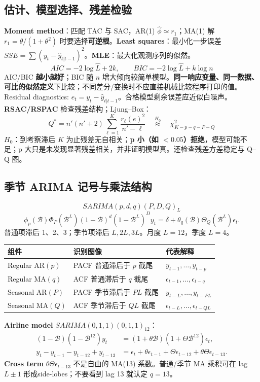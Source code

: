 \documentclass[UTF8,fontset=fandol,10.5pt,a4paper]{ctexart}
\newcommand{\eng}[1]{{\sffamily\color{navy}#1}}
\newcommand{\formula}[1]{\[\boxed{#1}\]}
\newcommand{\thick}{\renewcommand{\arraystretch}{1.18}}
\begin{document}
\subsection{估计、模型选择、残差检验}
\textbf{Moment method}：匹配 TAC 与 SAC，AR(1) $\hat\phi\simeq r_1$；MA(1) 解 $r_1=\theta/(1+\theta^2)$ 时要选择\textbf{可逆根}。\textbf{Least squares}：最小化一步误差 $SSE=\sum(y_t-\hat y_{t|t-1})^2$。\textbf{MLE}：最大化观测序列的似然。
\formula{AIC=-2\log\hat L+2k,\qquad BIC=-2\log\hat L+k\log n}
AIC/BIC \textbf{越小越好}；BIC 随 $n$ 增大倾向较简单模型。\textbf{同一响应变量、同一数据、可比的似然定义}下比较；不同差分/变换时不应直接机械比较程序打印的值。
\eng{Residual diagnostics}: $e_t=y_t-\hat y_{t|t-1}$。合格模型剩余误差应近似白噪声。\textbf{RSAC/RSPAC} 检查残差结构；\eng{Ljung--Box}：
\formula{Q^*=n'(n'+2)\sum_{\ell=1}^{K}\frac{r_\ell(e)^2}{n'-\ell}\quad\overset{H_0}{\approx}\quad\chi^2_{K-p-q-P-Q}}
$H_0$：到考察滞后 $K$ 为止残差无自相关；\textbf{p 小（如 $<0.05$）拒绝}，模型可能不足；p 大只是未发现显著残差相关，并非证明模型真。还检查残差方差稳定与 Q--Q 图。
\subsection{季节 ARIMA 记号与乘法结构}
\begin{keybox}
\formula{SARIMA(p,d,q)(P,D,Q)_L}
\[\phi_p(\mathcal B)\Phi_P(\mathcal B^L)(1-\mathcal B)^d(1-\mathcal B^L)^Dy_t=\delta+\theta_q(\mathcal B)\Theta_Q(\mathcal B^L)\epsilon_t.\]
普通项滞后 1、2、3；季节项滞后 $L,2L,3L$。月度 $L=12$，季度 $L=4$。
\end{keybox}
\begin{center}\thick\begin{tabularx}{0.98\linewidth}{lXX}\toprule
组件 & 识别图像 & 代表解释 \\\midrule
Regular AR$(p)$ & PACF 普通滞后于 $p$ 截尾 & $y_{t-1},\ldots,y_{t-p}$ \\
Regular MA$(q)$ & ACF 普通滞后于 $q$ 截尾 & $\epsilon_{t-1},\ldots,\epsilon_{t-q}$ \\
Seasonal AR$(P)$ & PACF 季节滞后于 $PL$ 截尾 & $y_{t-L},\ldots,y_{t-PL}$ \\
Seasonal MA$(Q)$ & ACF 季节滞后于 $QL$ 截尾 & $\epsilon_{t-L},\ldots,\epsilon_{t-QL}$ \\
\bottomrule\end{tabularx}\end{center}
\textbf{Airline model} $SARIMA(0,1,1)(0,1,1)_{12}$：
\begin{align*}
(1-\mathcal B)(1-\mathcal B^{12})y_t&=(1+\theta\mathcal B)(1+\Theta\mathcal B^{12})\epsilon_t,\\
y_t-y_{t-1}-y_{t-12}+y_{t-13}&=\epsilon_t+\theta\epsilon_{t-1}+\Theta\epsilon_{t-12}+\theta\Theta\epsilon_{t-13}.
\end{align*}
\textbf{Cross term} $\theta\Theta\epsilon_{t-13}$ 不是自由的 MA(13) 系数。普通/季节 MA 乘积可在 lag $L\pm1$ 形成\eng{side-lobes}；不要看到 lag 13 就认定 $q=13$。
\end{document}
